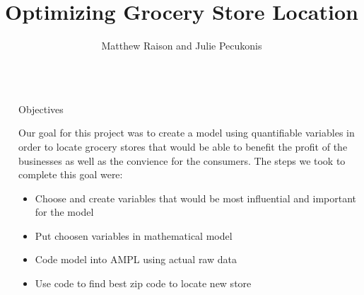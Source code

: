 \documentclass[final]{beamer}
\title{Optimizing Grocery Store Location} %
\author{Matthew Raison and Julie Pecukonis} %
\institute{Wentworth Institute of Technology, Department of Applied Mathematics} %
\newlength{\sepwid}
\newlength{\onecolwid}
\begin{document}

\setlength{\belowcaptionskip}{2ex} %
\setlength\belowdisplayshortskip{2ex} %

\begin{frame}[t] %

\begin{columns}[t] %

\begin{column}{\sepwid}\end{column} %

\begin{column}{\onecolwid} %


\begin{alertblock}{Objectives}
{\small
Our goal for this project was to create a model using quantifiable variables in order to locate grocery stores that would be able to benefit the profit of the businesses as well as the convience for the consumers. The steps we took to complete this goal were:  
\begin{itemize}
\item Choose and create variables that would be most influential and important for the model
\item Put choosen variables in mathematical model 
\item Code model into AMPL using actual raw data 
\item Use code to find best zip code to locate new store
\end{itemize}
}
\end{alertblock}



\end{column}
\end{columns}
\end{frame}
\end{document}
